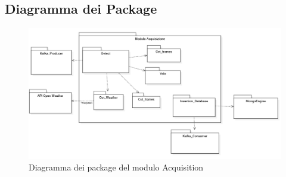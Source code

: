 \subsection{Diagramma dei Package}
\begin{figure}[H]
  \begin{center}
    \includegraphics[scale=0.6]{../immagini/diag_PB/diag_pack_acqui.png}
    \caption{Diagramma dei package del modulo Acquisition}
  \end{center}
\end{figure}

